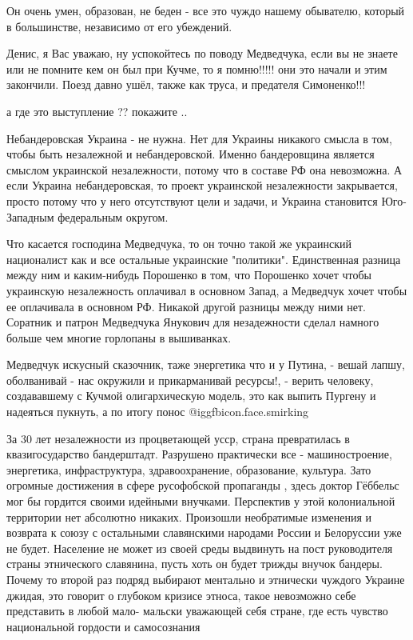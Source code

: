 \begin{itemize}

Он очень умен, образован, не беден - все это чуждо нашему обывателю, который в
большинстве, независимо от его убеждений.



Денис, я Вас уважаю, ну успокойтесь по поводу Медведчука, если вы не знаете или не
помните кем он был при Кучме, то я помню!!!!! они это начали и этим
закончили. Поезд давно ушёл, также как труса, и предателя Симоненко!!!

а где это выступление ?? покажите ..


Небандеровская Украина - не нужна. Нет для Украины никакого смысла в том, чтобы
быть незалежной и небандеровской. Именно бандеровщина является смыслом
украинской незалежности, потому что в составе РФ она невозможна. А если Украина
небандеровская, то проект украинской незалежности закрывается, просто потому
что у него отсутствуют цели и задачи, и Украина становится Юго-Западным
федеральным округом.

Что касается господина Медведчука, то он точно такой же украинский националист
как и все остальные украинские "политики". Единственная разница между ним и
каким-нибудь Порошенко в том, что Порошенко хочет чтобы украинскую незалежность
оплачивал в основном Запад, а Медведчук хочет чтобы ее оплачивала в основном
РФ. Никакой другой разницы между ними нет. Соратник и патрон Медведчука
Янукович для незадежности сделал намного больше чем многие горлопаны в
вышиванках.


Медведчук искусный сказочник, таже энергетика что и у Путина, - вешай
лапшу, оболванивай - нас окружили и прикарманивай ресурсы!, - верить
человеку, создававшему с Кучмой олигархическую модель, это как выпить Пургену и
надеяться пукнуть, а по итогу понос @igg{fbicon.face.smirking} 


За 30 лет незалежности из процветающей усср, страна превратилась в
квазигосударство бандерштадт. Разрушено практически все - машиностроение,
энергетика, инфраструктура, здравоохранение, образование, культура. Зато
огромные достижения в сфере русофобской пропаганды , здесь доктор Гёббельс мог
бы гордится своими идейными внучками. Перспектив у этой колониальной
территории нет абсолютно никаких. Произошли необратимые изменения и возврата к
союзу с остальными славянскими народами России и Белоруссии уже не будет.
Население не может из своей среды выдвинуть на пост руководителя страны
этнического славянина, пусть хоть он будет трижды внучок бандеры. Почему то
второй раз подряд выбирают ментально и этнически чуждого Украине джидая, это
говорит о глубоком кризисе этноса, такое невозможно себе представить в любой
мало- мальски уважающей себя стране, где есть чувство национальной гордости и
самосознания


\end{itemize}
